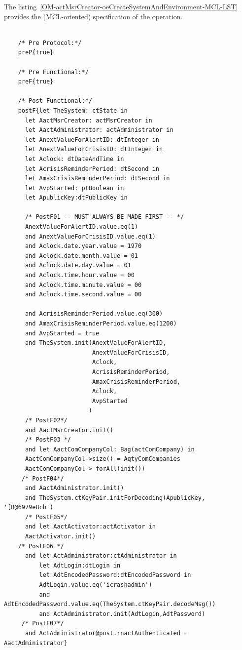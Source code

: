 \begin{operationmodel}
	\end{operationmodel}



	\vspace{1cm}
	The listing~\ref{OM-actMsrCreator-oeCreateSystemAndEnvironment-MCL-LST} provides the \msrmessir (MCL-oriented) specification of the operation.
	
	\scriptsize
	\vspace{0.5cm}
	\begin{lstlisting}[style=MessirStyle,firstnumber=auto,captionpos=b,caption={\msrmessir (MCL-oriented) specification of the operation \emph{oeCreateSystemAndEnvironment}.},label=OM-actMsrCreator-oeCreateSystemAndEnvironment-MCL-LST]

	/* Pre Protocol:*/ 
	preP{true}
	
	/* Pre Functional:*/
	preF{true}
	
	/* Post Functional:*/ 
	postF{let TheSystem: ctState in
	  let AactMsrCreator: actMsrCreator in
	  let AactAdministrator: actAdministrator in
	  let AnextValueForAlertID: dtInteger in
	  let AnextValueForCrisisID: dtInteger in
	  let Aclock: dtDateAndTime in
	  let AcrisisReminderPeriod: dtSecond in
	  let AmaxCrisisReminderPeriod: dtSecond in
	  let AvpStarted: ptBoolean in
	  let ApublicKey:dtPublicKey in
	
	  /* PostF01 -- MUST ALWAYS BE MADE FIRST -- */ 
	  AnextValueForAlertID.value.eq(1)
	  and AnextValueForCrisisID.value.eq(1)
	  and Aclock.date.year.value = 1970 
	  and Aclock.date.month.value = 01
	  and Aclock.date.day.value = 01
	  and Aclock.time.hour.value = 00
	  and Aclock.time.minute.value = 00
	  and Aclock.time.second.value = 00
	
	  and AcrisisReminderPeriod.value.eq(300)
	  and AmaxCrisisReminderPeriod.value.eq(1200)
	  and AvpStarted = true
	  and TheSystem.init(AnextValueForAlertID,
	                     AnextValueForCrisisID,
	                     Aclock,
	                     AcrisisReminderPeriod,
	                     AmaxCrisisReminderPeriod,
	                     Aclock,
	                     AvpStarted
	                    )
	  /* PostF02*/ 
	  and AactMsrCreator.init()
	  /* PostF03 */ 
	  and let AactComCompanyCol: Bag(actComCompany) in
	  AactComCompanyCol->size() = AqtyComCompanies
	  AactComCompanyCol-> forAll(init())
	 /* PostF04*/ 
	  and AactAdministrator.init()
	  and TheSystem.ctKeyPair.initForDecoding(ApublicKey, '[B@6979e8cb')
	  /* PostF05*/ 
	  and let AactActivator:actActivator in
	  AactActivator.init()
	/* PostF06 */ 
	  and let ActAdministrator:ctAdministrator in
	      let AdtLogin:dtLogin in
	      let AdtEncodedPassword:dtEncodedPassword in
	      AdtLogin.value.eq('icrashadmin')
	      and AdtEncodedPassword.value.eq(TheSystem.ctKeyPair.decodeMsg())
	      and ActAdministrator.init(AdtLogin,AdtPassword)
	 /* PostF07*/ 
	  and ActAdministrator@post.rnactAuthenticated = AactAdministrator}
	

\end{lstlisting}

